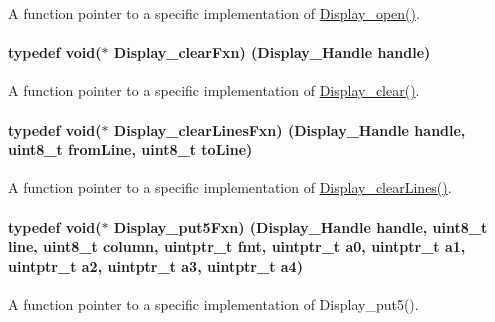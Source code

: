 A function pointer to a specific implementation of \hyperlink{_display_8h_a3aa87973a354d4fd6a2969f764e8afe6}{Display\+\_\+open()}. 

\paragraph[{Display\+\_\+clear\+Fxn}]{\setlength{\rightskip}{0pt plus 5cm}typedef void($\ast$ Display\+\_\+clear\+Fxn) ({\bf Display\+\_\+\+Handle} handle)}\label{_display_8h_af09f13daab765e83adfac09551e3ee51}


A function pointer to a specific implementation of \hyperlink{_display_8h_ab5a031704e2a1a9525d2c1a92346f842}{Display\+\_\+clear()}. 

\paragraph[{Display\+\_\+clear\+Lines\+Fxn}]{\setlength{\rightskip}{0pt plus 5cm}typedef void($\ast$ Display\+\_\+clear\+Lines\+Fxn) ({\bf Display\+\_\+\+Handle} handle, uint8\+\_\+t from\+Line, uint8\+\_\+t to\+Line)}\label{_display_8h_a8350bd25609f51433e21b502ed50f63a}


A function pointer to a specific implementation of \hyperlink{_display_8h_abae2ae910c2c533dbf11d24c656609d1}{Display\+\_\+clear\+Lines()}. 

\paragraph[{Display\+\_\+put5\+Fxn}]{\setlength{\rightskip}{0pt plus 5cm}typedef void($\ast$ Display\+\_\+put5\+Fxn) ({\bf Display\+\_\+\+Handle} handle, uint8\+\_\+t line, uint8\+\_\+t column, uintptr\+\_\+t fmt, uintptr\+\_\+t a0, uintptr\+\_\+t a1, uintptr\+\_\+t a2, uintptr\+\_\+t a3, uintptr\+\_\+t a4)}\label{_display_8h_a86694b64b96c51c587e649d82537746d}


A function pointer to a specific implementation of Display\+\_\+put5(). 

